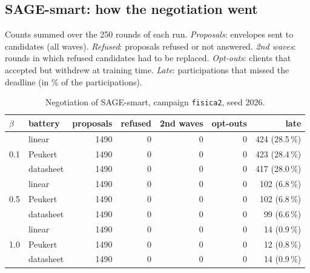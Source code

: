 \documentclass[11pt,a4paper]{article}
\begin{document}
\subsection{SAGE-smart: how the negotiation went}

Counts summed over the 250 rounds of each run. \emph{Proposals}: envelopes
sent to candidates (all waves). \emph{Refused}: proposals refused or not
answered. \emph{2nd waves}: rounds in which refused candidates had to be
replaced. \emph{Opt-outs}: clients that accepted but withdrew at training time.
\emph{Late}: participations that missed the deadline (in \% of the
participations).

\begin{table}[H]
\centering
\caption{Negotiation of SAGE-smart, campaign \texttt{fisica2}, seed 2026.}
\label{tab:negotiation}
\begin{tabular}{llrrrrr}
\toprule
$\beta$ & battery & proposals & refused & 2nd waves & opt-outs & late \\
\midrule
\multirow{3}{*}{0.1} & linear    & 1490 & 0 & 0 & 0 & 424 (28.5\,\%) \\
                     & Peukert   & 1490 & 0 & 0 & 0 & 423 (28.4\,\%) \\
                     & datasheet & 1490 & 0 & 0 & 0 & 417 (28.0\,\%) \\
\midrule
\multirow{3}{*}{0.5} & linear    & 1490 & 0 & 0 & 0 & 102 (6.8\,\%) \\
                     & Peukert   & 1490 & 0 & 0 & 0 & 102 (6.8\,\%) \\
                     & datasheet & 1490 & 0 & 0 & 0 &  99 (6.6\,\%) \\
\midrule
\multirow{3}{*}{1.0} & linear    & 1490 & 0 & 0 & 0 &  14 (0.9\,\%) \\
                     & Peukert   & 1490 & 0 & 0 & 0 &  12 (0.8\,\%) \\
                     & datasheet & 1490 & 0 & 0 & 0 &  14 (0.9\,\%) \\
\bottomrule
\end{tabular}
\end{table}
\end{document}
